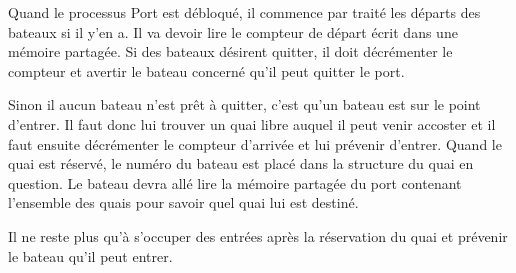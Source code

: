 \documentclass[a4paper, 11pt]{article}
\begin{document}
		Quand le processus Port est débloqué, il commence par traité les départs des bateaux si il y'en a. Il va devoir lire le compteur de départ écrit dans une mémoire partagée. Si des bateaux désirent quitter, il doit décrémenter le compteur et avertir le bateau concerné qu'il peut quitter le port. 
		
		
		Sinon il aucun bateau n'est prêt à quitter, c'est qu'un bateau est sur le point d'entrer. Il faut donc lui trouver un quai libre auquel il peut venir accoster et il faut ensuite décrémenter le compteur d'arrivée et lui prévenir d'entrer. Quand le quai est réservé, le numéro du bateau est placé dans la structure du quai en question. Le bateau devra allé lire la mémoire partagée du port contenant l'ensemble des quais pour savoir quel quai lui est destiné.
		
		
		Il ne reste plus qu'à s'occuper des entrées après la réservation du quai et prévenir le bateau qu'il peut entrer.
			
\end{document}
